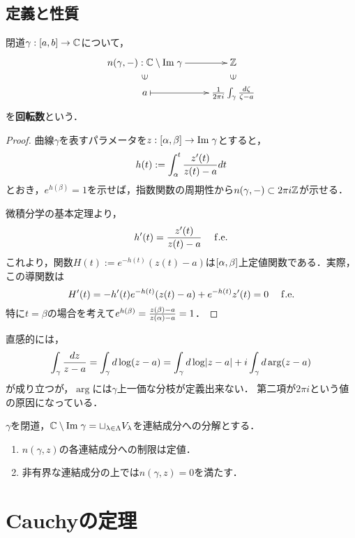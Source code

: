 \documentclass[uplatex, dvipdfmx]{jsreport}
\begin{document}
\subsection{定義と性質}

\begin{definition}
    閉道$\gamma:[a,b]\to\mathbb{C}$について，
    \[\xymatrix@R-2pc{
        n(\gamma,-):\C\setminus\Im\gamma\ar[r]&\Z\\
        \rotatebox[origin=c]{90}{$\in$}&\rotatebox[origin=c]{90}{$\in$}\\
        a\ar@{|->}[r]&\frac{1}{2\pi i}\int_\gamma\frac{d\zeta}{\zeta-a}
    }\]
    を\textbf{回転数}という．
\end{definition}
\begin{proof}
    曲線$\gamma$を表すパラメータを$z:[\alpha,\beta]\to\mathrm{Im}\;\gamma$とすると，
    \[h(t):=\int^t_\alpha\frac{z'(t)}{z(t)-a}dt\]
    とおき，$e^{h(\beta)}=1$を示せば，指数関数の周期性から$n(\gamma,-)\subset 2\pi i\mathbb{Z}$が示せる．

    微積分学の基本定理より，
    \[h'(t)=\frac{z'(t)}{z(t)-a}\quad\;\mathrm{f.e.}\]
    これより，関数$H(t):=e^{-h(t)}(z(t)-a)$は$[\alpha,\beta]$上定値関数である．実際，この導関数は
    \[H'(t)=-h'(t)e^{-h(t)}(z(t)-a)+e^{-h(t)}z'(t)=0\quad\;\mathrm{f.e.}\]
    特に$t=\beta$の場合を考えて$e^{h(\beta)}=\frac{z(\beta)-a}{z(\alpha)-a}=1$．
\end{proof}
\begin{remarks}[対数関数のRiemann面を登っていく描像]
    直感的には，
    \[\int_\gamma\frac{dz}{z-a}=\int_\gamma d\log(z-a)=\int_\gamma d\log\lvert z-a\rvert+i\int_\gamma d\arg(z-a)\]
    が成り立つが，$\arg$には$\gamma$上一価な分枝が定義出来ない．
    第二項が$2\pi i$という値の原因になっている．
\end{remarks}

\begin{proposition}[回転数の性質]
    $\gamma$を閉道，$\mathbb{C}\setminus\mathrm{Im}\;\gamma=\sqcup_{\lambda\in\Lambda}V_\lambda$を連結成分への分解とする．
    \begin{enumerate}
        \item $n(\gamma,z)$の各連結成分への制限は定値．
        \item 非有界な連結成分の上では$n(\gamma,z)=0$を満たす．
    \end{enumerate}
\end{proposition}

\section{Cauchyの定理}
\end{document}
